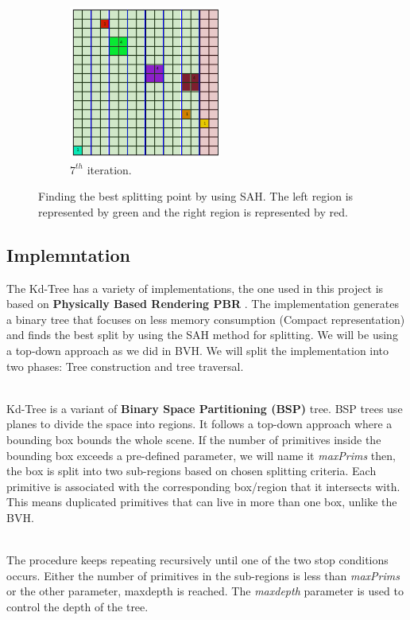 \documentclass[11pt,a4paper]{article}
\begin{document}
\begin{figure}[H]
\begin{subfigure}[b]{0.475\textwidth}
         \centering
         \includegraphics[width=5cm]{images/kdtree/grid_8.png}
         \caption{$7^{th} $ iteration.}
         \label{fig:pi_18000}
     \end{subfigure}
        \captionsetup{justification=centering,margin=2cm}
        \caption{Finding the best splitting point by using SAH. The left region is represented by green and the right region is represented by red.}
        \label{fig:sahdemo}
\end{figure}



\subsection{Implemntation}
The Kd-Tree has a variety of implementations, the one used in this project is based on \textbf{Physically Based Rendering PBR} \protect\cite{Pharr2016}. The implementation generates a binary tree that focuses on less memory consumption (Compact representation) and finds the best split by using the SAH method for splitting. We will be using a top-down approach as we did in BVH. We will split the implementation into two phases: Tree construction and tree traversal.

\noindent
\\
Kd-Tree is a variant of \textbf{Binary Space Partitioning (BSP)} tree. BSP trees use planes to divide the space into regions. It follows a top-down approach where a bounding box bounds the whole scene. If the number of primitives inside the bounding box exceeds a pre-defined parameter, we will name it \textit{maxPrims} then, the box is split into two sub-regions based on chosen splitting criteria. Each primitive is associated with the corresponding box/region that it intersects with. This means duplicated primitives that can live in more than one box, unlike the BVH.

\noindent
\\
The procedure keeps repeating recursively until one of the two stop conditions occurs. Either the number of primitives in the sub-regions is less than \textit{maxPrims} or the other parameter, maxdepth is reached. The \textit{maxdepth} parameter is used to control the depth of the tree.  
\end{document}
